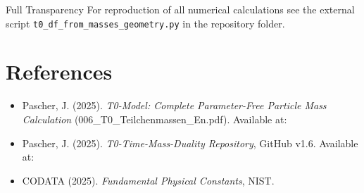 	\begin{important}{Full Transparency}{}
		For reproduction of all numerical calculations see the external script \texttt{t0\_df\_from\_masses\_geometry.py} in the repository folder.
	\end{important}
	
	\section{References}
	\label{sec:references}
	
	\begin{itemize}
		\item Pascher, J. (2025). \emph{T0-Model: Complete Parameter-Free Particle Mass Calculation} (006\_T0\_Teilchenmassen\_En.pdf). Available at: 
		
		\item Pascher, J. (2025). \emph{T0-Time-Mass-Duality Repository}, GitHub v1.6. Available at: 
		
		\item CODATA (2025). \emph{Fundamental Physical Constants}, NIST.
	\end{itemize}
